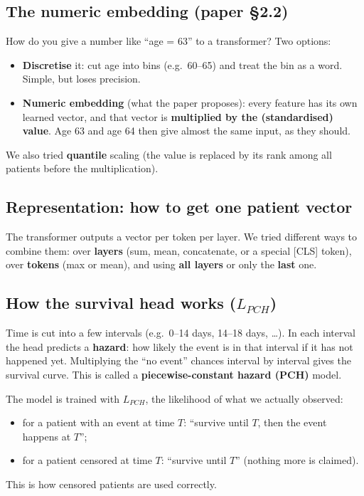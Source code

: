 \documentclass[11pt]{article}
\begin{document}
\subsection{The numeric embedding (paper \S2.2)}
How do you give a number like ``age = 63'' to a transformer? Two options:
\begin{itemize}
  \item \textbf{Discretise} it: cut age into bins (e.g.\ 60--65) and treat the bin as a word. Simple,
        but loses precision.
  \item \textbf{Numeric embedding} (what the paper proposes): every feature has its own learned vector,
        and that vector is \textbf{multiplied by the (standardised) value}. Age 63 and age 64 then give
        almost the same input, as they should.
\end{itemize}
We also tried \textbf{quantile} scaling (the value is replaced by its rank among all patients before
the multiplication).

\subsection{Representation: how to get one patient vector}
The transformer outputs a vector per token per layer. We tried different ways to combine them: over
\textbf{layers} (sum, mean, concatenate, or a special [CLS] token), over \textbf{tokens} (max or mean),
and using \textbf{all layers} or only the \textbf{last} one.

\subsection{How the survival head works ($L_{PCH}$)}
Time is cut into a few intervals (e.g.\ 0--14 days, 14--18 days, \dots). In each interval the head
predicts a \textbf{hazard}: how likely the event is in that interval if it has not happened yet.
Multiplying the ``no event'' chances interval by interval gives the survival curve. This is called a
\textbf{piecewise-constant hazard (PCH)} model.

The model is trained with $L_{PCH}$, the likelihood of what we actually observed:
\begin{itemize}
  \item for a patient with an event at time $T$: ``survive until $T$, then the event happens at $T$'';
  \item for a patient censored at time $T$: ``survive until $T$'' (nothing more is claimed).
\end{itemize}
This is how censored patients are used correctly.
\end{document}
